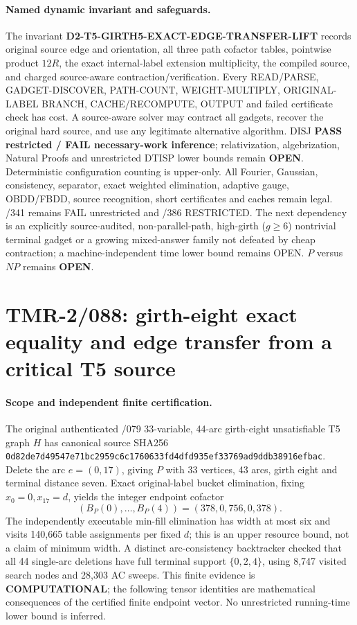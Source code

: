 \documentclass[11pt]{article}
\begin{document}
\paragraph{Named dynamic invariant and safeguards.}
The invariant \textbf{D2-T5-GIRTH5-EXACT-EDGE-TRANSFER-LIFT}
records original source edge and orientation, all
three path cofactor tables, pointwise product $12R$,
the exact internal-label extension multiplicity,
the compiled source, and charged source-aware
contraction/verification. Every READ/PARSE,
GADGET-DISCOVER, PATH-COUNT, WEIGHT-MULTIPLY,
ORIGINAL-LABEL BRANCH, CACHE/RECOMPUTE,
OUTPUT and failed certificate check has cost.
A source-aware solver may contract all gadgets,
recover the original hard source, and use any
legitimate alternative algorithm. DISJ
\textbf{PASS restricted / FAIL necessary-work inference};
relativization, algebrization, Natural Proofs and
unrestricted DTISP lower bounds remain \textbf{OPEN}.
Deterministic configuration counting is upper-only.
All Fourier, Gaussian, consistency, separator, exact
weighted elimination, adaptive gauge, OBDD/FBDD,
source recognition, short certificates and caches remain
legal. /341 remains FAIL unrestricted and /386
RESTRICTED. The next dependency is an explicitly
source-audited, non-parallel-path, high-girth
($g\ge6$) nontrivial terminal gadget or a growing
mixed-answer family not defeated by cheap contraction;
a machine-independent time lower bound remains OPEN.
$P$ versus $NP$ remains \textbf{OPEN}.

\section{TMR-2/088: girth-eight exact equality and edge transfer from a critical T5 source}
\paragraph{Scope and independent finite certification.}
The original authenticated /079 33-variable, 44-arc girth-eight
unsatisfiable T5 graph $H$ has canonical source SHA256
\texttt{0d82de7d49547e71bc2959c6c1760633fd4dfd935ef33769ad9ddb38916efbac}.
Delete the arc $e=(0,17)$, giving $P$ with 33 vertices, 43
arcs, girth eight and terminal distance seven. Exact
original-label bucket elimination, fixing $x_0=0,x_{17}=d$,
yields the integer endpoint cofactor
\[
(B_P(0),\ldots,B_P(4))=(378,0,756,0,378).
\]
The independently executable min-fill elimination has width at most
six and visits 140,665 table assignments per fixed $d$; this
is an upper resource bound, not a claim of minimum width.
A distinct arc-consistency backtracker checked that all 44
single-arc deletions have full terminal support
$\{0,2,4\}$, using 8,747 visited search nodes and 28,303
AC sweeps. This finite evidence is \textbf{COMPUTATIONAL};
the following tensor identities are mathematical consequences
of the certified finite endpoint vector. No unrestricted
running-time lower bound is inferred.
\end{document}

